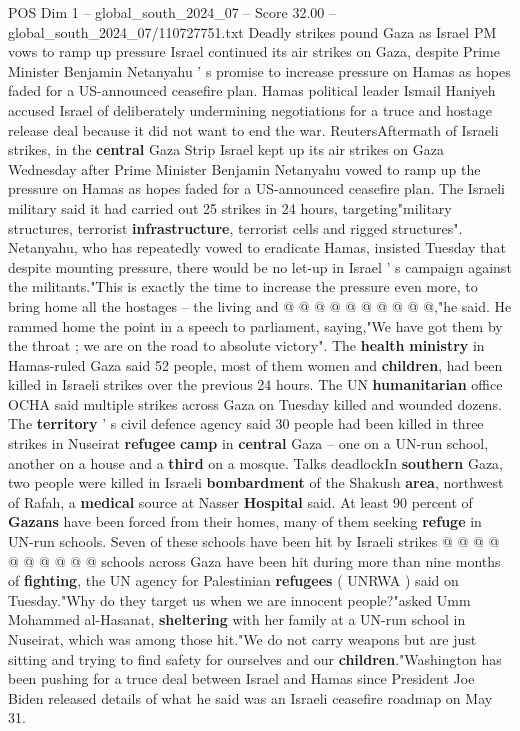 \begin{textsample}{POS Dim 1 – global\_south\_2024\_07 – Score 32.00 – global\_south\_2024\_07/110727751.txt}  \label{ex:f1_pos_174}
Deadly strikes pound Gaza as Israel PM vows to ramp up pressure Israel continued its air strikes on Gaza, despite Prime Minister Benjamin Netanyahu ' s promise to increase pressure on Hamas as hopes faded for a US-announced ceasefire plan.
Hamas political leader Ismail Haniyeh accused Israel of deliberately undermining negotiations for a truce and hostage release deal because it did not want to end the war.
ReutersAftermath of Israeli strikes, in the \textbf{central} Gaza Strip Israel kept up its air strikes on Gaza Wednesday after Prime Minister Benjamin Netanyahu vowed to ramp up the pressure on Hamas as hopes faded for a US-announced ceasefire plan.
The Israeli military said it had carried out 25 strikes in 24 hours, targeting"military structures, terrorist \textbf{infrastructure}, terrorist cells and rigged structures".
Netanyahu, who has repeatedly vowed to eradicate Hamas, insisted Tuesday that despite mounting pressure, there would be no let-up in Israel ' s campaign against the militants."This is exactly the time to increase the pressure even more, to bring home all the hostages -- the living and @ @ @ @ @ @ @ @ @ @,"he said.
He rammed home the point in a speech to parliament, saying,"We have got them by the throat ; we are on the road to absolute victory".
The \textbf{health} \textbf{ministry} in Hamas-ruled Gaza said 52 people, most of them women and \textbf{children}, had been killed in Israeli strikes over the previous 24 hours.
The UN \textbf{humanitarian} office OCHA said multiple strikes across Gaza on Tuesday killed and wounded dozens.
The \textbf{territory} ' s civil defence agency said 30 people had been killed in three strikes in Nuseirat \textbf{refugee} \textbf{camp} in \textbf{central} Gaza -- one on a UN-run school, another on a house and a \textbf{third} on a mosque.
Talks deadlockIn \textbf{southern} Gaza, two people were killed in Israeli \textbf{bombardment} of the Shakush \textbf{area}, northwest of Rafah, a \textbf{medical} source at Nasser \textbf{Hospital} said.
At least 90 percent of \textbf{Gazans} have been forced from their homes, many of them seeking \textbf{refuge} in UN-run schools.
Seven of these schools have been hit by Israeli strikes @ @ @ @ @ @ @ @ @ @ schools across Gaza have been hit during more than nine months of \textbf{fighting}, the UN agency for Palestinian \textbf{refugees} ( UNRWA ) said on Tuesday."Why do they target us when we are innocent people?"asked Umm Mohammed al-Hasanat, \textbf{sheltering} with her family at a UN-run school in Nuseirat, which was among those hit."We do not carry weapons but are just sitting and trying to find safety for ourselves and our \textbf{children}."Washington has been pushing for a truce deal between Israel and Hamas since President Joe Biden released details of what he said was an Israeli ceasefire roadmap on May 31.

\end{textsample}
